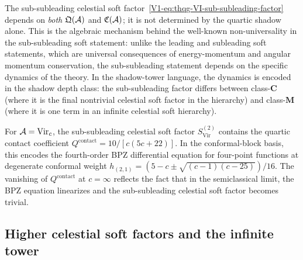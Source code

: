 \begin{remark}
The sub-subleading celestial soft factor~\eqref{V1-eq:thqg-VI-sub-subleading-factor}
depends on \emph{both} $\mathfrak{Q}(\mathcal{A})$ and
$\mathfrak{C}(\mathcal{A})$; it is not determined by the quartic shadow
alone. This is the algebraic mechanism behind the well-known
non-universality in the sub-subleading soft statement:
unlike the leading and subleading soft statements, which are universal
consequences of energy-momentum and angular momentum conservation,
the sub-subleading statement depends on the specific dynamics of the
theory. In the shadow-tower language, the dynamics is encoded in
the shadow depth class: the sub-subleading factor differs
between class-$\mathbf{C}$ (where it is the final nontrivial
celestial soft factor in the hierarchy) and class-$\mathbf{M}$
(where it is one term in an infinite celestial soft hierarchy).
\end{remark}

\begin{remark}
For $\mathcal{A} = \mathrm{Vir}_c$, the sub-subleading celestial soft factor
$S^{(2)}_{\mathrm{Vir}}$ contains the quartic contact coefficient
$Q^{\mathrm{contact}} = 10/[c(5c+22)]$.
In the conformal-block basis, this encodes the fourth-order
BPZ differential equation for four-point functions at degenerate
conformal weight $h_{(2,1)} = (5-c \pm \sqrt{(c-1)(c-25)})/16$.
The vanishing of $Q^{\mathrm{contact}}$ at $c = \infty$
reflects the fact that in the semiclassical limit, the BPZ
equation linearizes and the sub-subleading celestial soft factor
becomes trivial.
\end{remark}

%
%

\subsection{Higher celestial soft factors and the infinite tower}
\label{subsec:thqg-VI-higher-soft}

